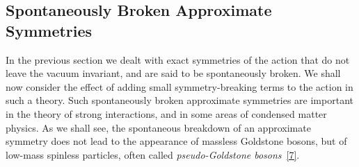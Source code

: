 
\subsection{Spontaneously Broken Approximate Symmetries}

In the previous section we dealt with exact symmetries of the action that do not leave the vacuum invariant, and are said to be spontaneously broken. We shall now consider the effect of adding small symmetry-breaking terms to the action in such a theory. Such spontaneously broken approximate symmetries are important in the theory of strong interactions, and in some areas of condensed matter physics. As we shall see, the spontaneous breakdown of an approximate symmetry does not lead to the appearance of massless Goldstone bosons, but of low-mass spinless particles, often called \emph{pseudo-Goldstone bosons}~\hyperref[ch19-ref-7]{[7]}.

